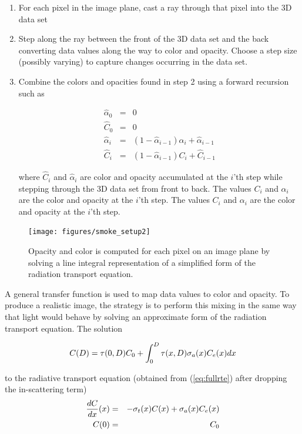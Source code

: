 \begin{enumerate}
\item For each pixel in the image plane, cast a ray through that pixel into the 3D data set
\item Step along the ray between the front of the 3D data set and the back
converting data values along the way to color and opacity.  Choose a step size (possibly varying) to capture changes occurring in the data set.
\item
Combine the colors and opacities found in step 2 using a forward recursion such as \cite[Chapter 39]{gpugems}

\begin{eqnarray*}
\hat{\alpha}_0&=&0\\
\hat{C}_0&=&0\\
\hat{\alpha}_i&=&\left(1-\hat{\alpha}_{i-1}\right)\alpha_i+\hat{\alpha}_{i-1}\\
\hat{C}_i&=&\left(1-\hat{\alpha}_{i-1}\right)C_i + \hat{C}_{i-1}
\end{eqnarray*}

where $\hat{C}_i$ and $\hat{\alpha}_i$ are color and opacity accumulated at the $i$'th step while stepping through the 3D data set from front to back.  The values $C_i$ and $\alpha_i$
are the color and opacity at the $i$'th step.
The values $C_i$ and $\alpha_i$
are the color and opacity at the $i$'th step.
\end{enumerate}

\begin{figure}[\figoptions]
\begin{center}
\texttt{[image: figures/smoke\_setup2]}
\end{center}
\caption {Opacity and color is computed for each pixel on an image plane by solving a line integral
representation of a simplified form of the radiation transport equation.
}
\label{figsmokesetup2}
\end{figure}

A general transfer function is used to map data values to color and opacity. To produce a realistic image, the strategy is to perform this mixing in the same way that light would behave by solving an approximate form of the radiation transport equation.  The solution

\begin{equation}
\label{eq:rtesoln}
 C(D)=\tau(0,D)C_0 + \int_0^D\tau(x,D)\sigma_a(x)C_e(x) dx
\end{equation}

to the radiative transport equation (obtained from (\ref{eq:fullrte}) after dropping the in-scattering term)
\begin{eqnarray*}
\frac{dC}{dx}(x)&=&-\sigma_t(x) C(x) + \sigma_a(x) C_e(x)\\
 C(0)&=&C_0\nonumber
\end{eqnarray*}


